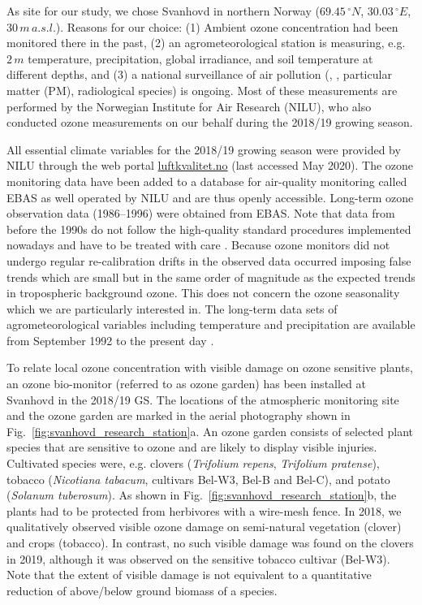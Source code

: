 \documentclass[bg, manuscript]{copernicus}
\begin{document}
As site for our study, we chose Svanhovd in northern Norway ($69.45\,\unit{^\circ N}$, $30.03\,\unit{^\circ E}$, $30\,\unit{m\,a.s.l.}$). Reasons for our choice: (1) Ambient ozone concentration had been monitored there in the past, (2) an agrometeorological station is measuring, e.g. $2\,\unit{m}$ temperature, precipitation, global irradiance, and soil temperature at different depths, and (3) a national surveillance of air pollution (, , particular matter (PM), radiological species) is ongoing. Most of these measurements are performed by the Norwegian Institute for Air Research (NILU), who also conducted ozone measurements on our behalf during the 2018/19 growing season. 

All essential climate variables for the 2018/19 growing season were provided by NILU through the web portal \href{luftkvalitet.no}{luftkvalitet.no} (last accessed May 2020). The ozone monitoring data have been added to a database for air-quality monitoring called EBAS as well operated by NILU and are thus openly accessible. Long-term ozone observation data (1986--1996) were obtained from EBAS. Note that data from before the 1990s do not follow the high-quality standard procedures implemented nowadays and have to be treated with care \citep{NILU2003}. Because ozone monitors did not undergo regular re-calibration drifts in the observed data occurred imposing false trends which are small but in the same order of magnitude as the expected trends in tropospheric background ozone. This does not concern the ozone seasonality which we are particularly interested in.
The long-term data sets of agrometeorological variables including temperature and precipitation are available from September 1992 to the present day \citep[LandbruksMeteorologiske Tjeneste][note the station name here is Pasvik]{LMT_NIBIO}.

To relate local ozone concentration \chem{[O_3]} with visible damage on ozone sensitive plants, an ozone bio-monitor (referred to as ozone garden) has been installed at Svanhovd in the 2018/19 GS. The locations of the atmospheric monitoring site and the ozone garden are marked in the aerial photography shown in Fig.~\ref{fig:svanhovd_research_station}a. An ozone garden consists of selected plant species that are sensitive to ozone and are likely to display visible injuries. Cultivated species were, e.g. clovers (\emph{Trifolium repens}, \emph{Trifolium pratense}), tobacco (\emph{Nicotiana tabacum}, cultivars Bel-W3, Bel-B and Bel-C), and potato (\emph{Solanum tuberosum}). As shown in Fig.~\ref{fig:svanhovd_research_station}b, the plants had to be protected from herbivores with a wire-mesh fence. In 2018, we qualitatively observed visible ozone damage on semi-natural vegetation (clover) and crops (tobacco). In contrast, no such visible damage was found on the clovers in 2019, although it was observed on the sensitive tobacco cultivar (Bel-W3). Note that the extent of visible damage is not equivalent to a quantitative reduction of above/below ground biomass of a species.
\end{document}
